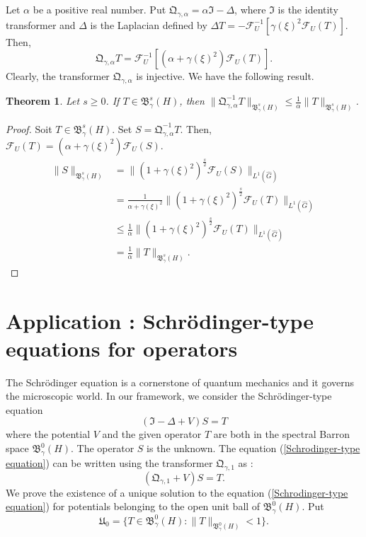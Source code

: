 \documentclass[11pt,a4paper]{amsart}
\newtheorem{theorem}{Theorem}[section]
\begin{document}
Let $\alpha$ be a positive real number. Put $\mathfrak{Q}_{\gamma,\alpha}=\alpha \mathfrak{I}-\Delta$, where $\mathfrak{I}$ is the identity transformer and $\Delta$ is the Laplacian defined by $\Delta T=-\mathcal{F}_U^{-1}[\gamma (\xi)^2\mathcal{F}_U(T)]$. 
 Then, 
\begin{equation}
\mathfrak{Q}_{\gamma,\alpha}T=\mathcal{F}_U^{-1}[(\alpha +\gamma (\xi)^2)\mathcal{F}_U(T)].
\end{equation}
Clearly, the transformer $\mathfrak{Q}_{\gamma,\alpha}$ is injective.  We have the following result. 
\begin{theorem} Let $s\geq 0$.
If $T\in \mathfrak{B}^s_\gamma(H)$, then 
$\|\mathfrak{Q}_{\gamma,\alpha}^{-1}T\|_{\mathfrak{B}^s_\gamma(H)}\leq \displaystyle\frac{1}{\alpha}\|T\|_{\mathfrak{B}^s_\gamma(H)}$.
\end{theorem}
\begin{proof}
Soit $T\in \mathfrak{B}^s_\gamma(H)$. Set $S=\mathfrak{Q}_{\gamma,\alpha}^{-1}T$. Then, $\mathcal{F}_U(T)=(\alpha +\gamma (\xi)^2)\mathcal{F}_U(S)$.
\begin{align*}
\|S\|_{\mathfrak{B}^s_\gamma(H)}&=\|(1 +\gamma (\xi)^2)^{\frac{s}{2}}\mathcal{F}_U(S)\|_{L^1(\widehat{G})}\\
&=\frac{1}{\alpha +\gamma (\xi)^2}\|(1 +\gamma (\xi)^2)^{\frac{s}{2}}\mathcal{F}_U(T)\|_{L^1(\widehat{G})}\\
&\leq \frac{1}{\alpha}\|(1 +\gamma (\xi)^2)^{\frac{s}{2}}\mathcal{F}_U(T)\|_{L^1(\widehat{G})}\\
&=\frac{1}{\alpha}\|T\|_{\mathfrak{B}^s_\gamma(H)}.
\end{align*}
\end{proof}




\section{Application : Schr\"odinger-type equations for operators}\label{Schrodinger}
The Schr\"odinger equation is a cornerstone of quantum mechanics and it governs the microscopic world. In our framework, we consider the Schr\"odinger-type equation 
\begin{equation}\label{Schrodinger-type equation}
(\mathfrak{I}-\Delta +V)S=T
\end{equation}
where the potential $V$ and the given operator $T$ are both in the spectral Barron space $\mathfrak{B}_\gamma^{0}(H)$. The operator $S$ is the unknown. 
The equation (\ref{Schrodinger-type equation}) can be written using the transformer $\mathfrak{Q}_{\gamma,1}$ as :
\begin{equation}\label{Schrodinger-type equation 2}
(\mathfrak{Q}_{\gamma,1} +V)S=T.
\end{equation}
We prove the existence of a unique solution to the equation (\ref{Schrodinger-type equation}) for potentials belonging to the open unit ball of $\mathfrak{B}_\gamma^{0}(H)$. 
Put 
$$\mathfrak{U}_0=\{T\in \mathfrak{B}_\gamma^{0}(H) : \|T\|_{\mathfrak{B}_\gamma^{0}(H)}<1\}.$$
\end{document}
